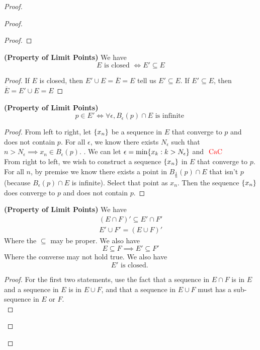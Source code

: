 \documentclass{report}
\begin{document}
\begin{proof}
\begin{proof}
\begin{proof}
\end{proof}
\begin{corollary}
\label{3.2.8}
\textbf{(Property of Limit Points)} We have
\begin{equation}
E\text{ is closed }\iff  E'\subseteq E
\end{equation}
\end{corollary}
\begin{proof}
If $E$ is closed, then  $E'\cup E=\overline{E}=E$ tell us $E'\subseteq E$. If $E'\subseteq E$, then $\overline{E}=E'\cup E=E$
\end{proof}
\begin{theorem}
\label{3.2.9}
\textbf{(Property of Limit Points)} 
\begin{equation}
p\in E'\iff \forall \epsilon, B_\epsilon (p)\cap E\text{ is infinite }
\end{equation}
\end{theorem}
\begin{proof}
  From left to right, let $\{ x_n \}$ be a sequence in $E$ that converge to $p$ and does not contain  $p$. For all $\epsilon$, we know there exists $N_\epsilon $ such that $n>N_\epsilon \implies x_n\in B_\epsilon (p)$. . We can let $\epsilon=\min \{ x_k:k>N_\epsilon  \}$ and $\text{ \textcolor{red}{CaC} }$\\

From right to left, we wish to construct a sequence $\{ x_n \}$ in $E$ that converge to $p$. For all $n$, by premise we know there exists a point in  $B_{\frac{1}{n}}(p)\cap E$ that isn't $p$  (because $B_{\epsilon }(p)\cap E$ is infinite). Select that point as $x_n$. Then the sequence $\{ x_n \}$ does converge to $p$ and does not contain $p$.
\end{proof}
\begin{theorem}
\label{3.2.10}
\textbf{(Property of Limit Points)} We have
\begin{gather}
(E\cap F)'\subseteq E'\cap F'\\
E'\cup F'=(E\cup F)'
\end{gather}
Where the $\subseteq$ may be proper. We also have
\begin{equation}
E\subseteq F\implies E'\subseteq F'
\end{equation}
Where the converse may not hold true. We also have
\begin{equation}
E'\text{ is closed. }
\end{equation}
\end{theorem}
\begin{proof}
For the first two statements, use the fact that a sequence in $E\cap F$ is in $E$ and a sequence in  $E$ is in $E\cup F$, and that a sequence in $E\cup F$ must has a sub-sequence in $E$ or $F$.\\


\end{proof}
\end{proof}
\end{proof}
\end{document}
